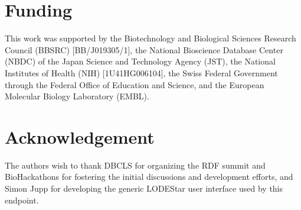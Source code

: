 \documentclass{bioinfo}
\begin{document}
\section{Funding} 
This work was supported by the Biotechnology and Biological Sciences Research Council (BBSRC) [BB/J019305/1], the National Bioscience Database Center (NBDC) of the Japan Science and Technology Agency (JST), the National Institutes of Health (NIH) [1U41HG006104], the Swiss Federal Government through the Federal Office of Education and Science, and the European Molecular Biology Laboratory (EMBL).  

\section*{Acknowledgement}
The authors wish to thank DBCLS for organizing the RDF summit and BioHackathons for fostering the initial discussions and development efforts, and Simon Jupp for developing the generic LODEStar user interface used by this endpoint.


%
%
%
%
%
%
  
\end{document}
